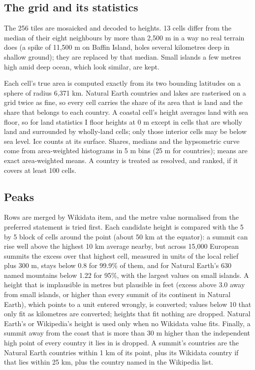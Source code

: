 \documentclass[11pt,a4paper]{article}
\begin{document}
\subsection{The grid and its statistics}
The 256 tiles are mosaicked and decoded to heights. 13 cells differ from the median of their eight neighbours by more than 2,500 m in a way no real terrain does (a spike of 11,500 m on Baffin Island, holes several kilometres deep in shallow ground); they are replaced by that median. Small islands a few metres high amid deep ocean, which look similar, are kept.

Each cell's true area is computed exactly from its two bounding latitudes on a sphere of radius 6,371 km. Natural Earth countries and lakes are rasterised on a grid twice as fine, so every cell carries the share of its area that is land and the share that belongs to each country. A coastal cell's height averages land with sea floor, so for land statistics I floor heights at 0 m except in cells that are wholly land and surrounded by wholly-land cells; only those interior cells may be below sea level. Ice counts at its surface. Shares, medians and the hypsometric curve come from area-weighted histograms in 5 m bins (25 m for countries); means are exact area-weighted means. A country is treated as resolved, and ranked, if it covers at least 100 cells.

\subsection{Peaks}
Rows are merged by Wikidata item, and the metre value normalised from the preferred statement is tried first. Each candidate height is compared with the 5 by 5 block of cells around the point (about 50 km at the equator): a summit can rise well above the highest 10 km average nearby, but across 15,000 European summits the excess over that highest cell, measured in units of the local relief plus 300 m, stays below 0.8 for 99.9\% of them, and for Natural Earth's 630 named mountains below 1.22 for 95\%, with the largest values on small islands. A height that is implausible in metres but plausible in feet (excess above 3.0 away from small islands, or higher than every summit of its continent in Natural Earth), which points to a unit entered wrongly, is converted; values below 10 that only fit as kilometres are converted; heights that fit nothing are dropped. Natural Earth's or Wikipedia's height is used only when no Wikidata value fits. Finally, a summit away from the coast that is more than 30 m higher than the independent high point of every country it lies in is dropped. A summit's countries are the Natural Earth countries within 1 km of its point, plus its Wikidata country if that lies within 25 km, plus the country named in the Wikipedia list.
\end{document}
